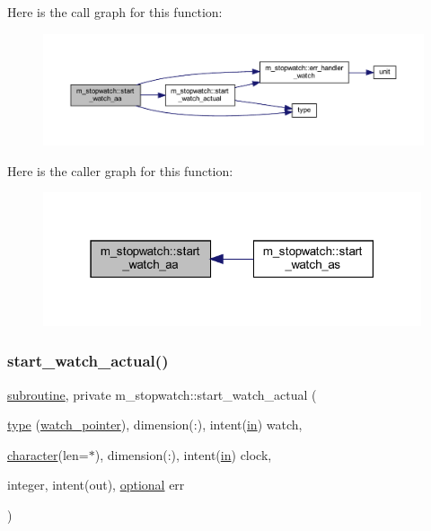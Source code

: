 Here is the call graph for this function\+:
\nopagebreak
\begin{figure}[H]
\begin{center}
\leavevmode
\includegraphics[width=350pt]{namespacem__stopwatch_ab76844fff5eb77d00bf4db5516902414_cgraph}
\end{center}
\end{figure}
Here is the caller graph for this function\+:
\nopagebreak
\begin{figure}[H]
\begin{center}
\leavevmode
\includegraphics[width=316pt]{namespacem__stopwatch_ab76844fff5eb77d00bf4db5516902414_icgraph}
\end{center}
\end{figure}
\mbox{\label{namespacem__stopwatch_a80ef48faa6df7821de6ef06c0fa650fe}} 
\subsubsection{\texorpdfstring{start\+\_\+watch\+\_\+actual()}{start\_watch\_actual()}}
{\footnotesize\ttfamily \hyperlink{M__stopwatch_83_8txt_acfbcff50169d691ff02d4a123ed70482}{subroutine}, private m\+\_\+stopwatch\+::start\+\_\+watch\+\_\+actual (\begin{DoxyParamCaption}\item[{\hyperlink{stop__watch_83_8txt_a70f0ead91c32e25323c03265aa302c1c}{type} (\hyperlink{structm__stopwatch_1_1watch__pointer}{watch\+\_\+pointer}), dimension(\+:), intent(\hyperlink{M__journal_83_8txt_afce72651d1eed785a2132bee863b2f38}{in})}]{watch,  }\item[{\hyperlink{option__stopwatch_83_8txt_abd4b21fbbd175834027b5224bfe97e66}{character}(len=$\ast$), dimension(\+:), intent(\hyperlink{M__journal_83_8txt_afce72651d1eed785a2132bee863b2f38}{in})}]{clock,  }\item[{integer, intent(out), \hyperlink{option__stopwatch_83_8txt_aa4ece75e7acf58a4843f70fe18c3ade5}{optional}}]{err }\end{DoxyParamCaption})\hspace{0.3cm}{\ttfamily [private]}}




